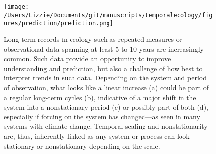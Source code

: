 \documentclass[11pt,a4paper,oneside]{article}
\begin{document}


\newpage
\begin{footnotesize}
{\def\section*#1{}

}
\end{footnotesize}

\newpage

\begin{figure}[h!]
\centering
\noindent \texttt{[image: /Users/Lizzie/Documents/git/manuscripts/temporalecology/figures/prediction/prediction.png]}
\caption{Long-term records in ecology such as repeated measures or observational data spanning at least 5 to 10 years are increasingly common. Such data provide an opportunity to improve understanding and prediction, but also a challenge of how best to interpret trends in such data. Depending on the system and period of observation, what looks like a linear increase (a) could be part of a regular long-term cycles (b), indicative of a major shift in the system into a nonstationary period (c) or possibly part of both (d), especially if forcing on the system has changed---as seen in many systems with climate change. Temporal scaling and nonstationarity are, thus, inherently linked as any system or process can look stationary or nonstationary depending on the scale.}
\end{figure}
\end{document}

